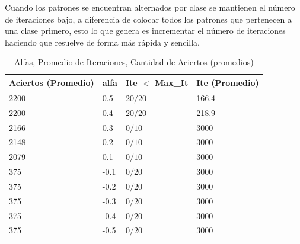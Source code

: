 \documentclass[8.5pt,twoside,twocolumn]{article}
\begin{document}
        Cuando los patrones se encuentran alternados por clase se mantienen el n\'umero de iteraciones bajo, a diferencia de 
        colocar todos los patrones que pertenecen a una clase primero, esto lo que genera es incrementar el n\'umero de iteraciones
        haciendo que resuelve de forma m\'as r\'apida y sencilla.

        \begin{table}[h]
        \small
        \caption{ Alfas, Promedio de Iteraciones, Cantidad de Aciertos (promedios) }
        \label{tbl:example}
        \begin{tabular*}{0.5\textwidth}{@{\extracolsep{\fill}}llll}
        \hline
        Aciertos (Promedio) & alfa & Ite $<$ Max\_It & Ite (Promedio)\\
        \hline
        2200 & 0.5 & $20/20$ &  166.4\\
        2200  & 0.4 & $20/20$ & 218.9  \\
        2166 & 0.3 & $0/10$ &  3000 \\
        2148 & 0.2 & $0/10$ &  3000 \\
        2079 & 0.1 & $0/10$ &  3000 \\
        375  & -0.1 & $0/20$ & 3000 \\
        375  & -0.2 & $0/20$ & 3000 \\
        375  & -0.3 & $0/20$ & 3000 \\
        375  & -0.4 & $0/20$ & 3000 \\
        375  & -0.5 & $0/20$ & 3000 \\
        \hline
        \end{tabular*}
        \end{table}



\footnotesize{
}
\end{document}
